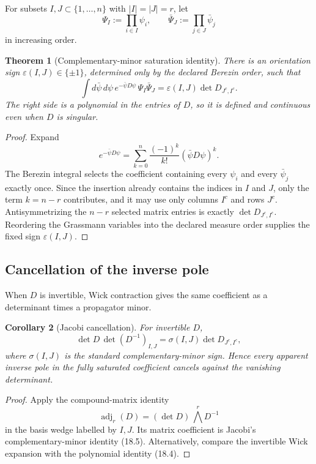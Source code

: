 \documentclass[11pt]{article}
\newtheorem{theorem}{Theorem}[section]
\newtheorem{corollary}[theorem]{Corollary}
\begin{document}
For subsets \(I,J\subset\{1,\ldots,n\}\) with
\(|I|=|J|=r\), let
\[
 \Psi_I:=\prod_{i\in I}\psi_i,
 \qquad
 \bar\Psi_J:=\prod_{j\in J}\bar\psi_j
 \tag{18.3}
\]
in increasing order.

\begin{theorem}[Complementary-minor saturation identity]
\label{thm:v11v18-minor}
There is an orientation sign \(\varepsilon(I,J)\in\{\pm1\}\), determined
only by the declared Berezin order, such that
\[
 \int d\bar\psi\,d\psi\,
 e^{-\bar\psi D\psi}\,
 \Psi_I\bar\Psi_J
 =
 \varepsilon(I,J)
 \det D_{J^c,I^c}.
 \tag{18.4}
\]
The right side is a polynomial in the entries of \(D\), so it is defined
and continuous even when \(D\) is singular.
\end{theorem}

\begin{proof}
Expand
\[
 e^{-\bar\psi D\psi}
 =
 \sum_{k=0}^n\frac{(-1)^k}{k!}(\bar\psi D\psi)^k.
\]
The Berezin integral selects the coefficient containing every
\(\psi_i\) and every \(\bar\psi_j\) exactly once.  Since the insertion
already contains the indices in \(I\) and \(J\), only the term
\(k=n-r\) contributes, and it may use only columns \(I^c\) and rows
\(J^c\).  Antisymmetrizing the \(n-r\) selected matrix entries is exactly
\(\det D_{J^c,I^c}\).  Reordering the Grassmann variables into the
declared measure order supplies the fixed sign \(\varepsilon(I,J)\).
\end{proof}

\subsection{Cancellation of the inverse pole}

When \(D\) is invertible, Wick contraction gives the same coefficient as
a determinant times a propagator minor.

\begin{corollary}[Jacobi cancellation]
\label{cor:v11v18-jacobi}
For invertible \(D\),
\[
 \det D\,
 \det (D^{-1})_{I,J}
 =
 \sigma(I,J)\det D_{J^c,I^c},
 \tag{18.5}
\]
where \(\sigma(I,J)\) is the standard complementary-minor sign.  Hence
every apparent inverse pole in the fully saturated coefficient cancels
against the vanishing determinant.
\end{corollary}

\begin{proof}
Apply the compound-matrix identity
\[
 \operatorname{adj}_r(D)
 =
 (\det D)\,\bigwedge^rD^{-1}
 \tag{18.6}
\]
in the basis wedge labelled by \(I,J\).  Its matrix coefficient is
Jacobi's complementary-minor identity (18.5).  Alternatively, compare
the invertible Wick expansion with the polynomial identity (18.4).
\end{proof}
\end{document}
